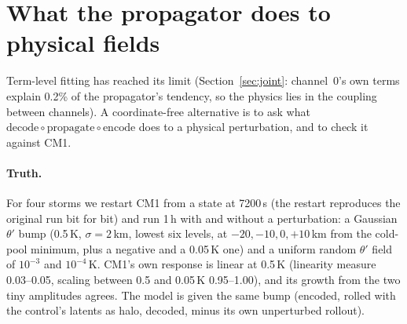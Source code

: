 \documentclass[11pt]{article}
\begin{document}
\section{What the propagator does to physical fields}\label{sec:paired}
Term-level fitting has reached its limit (Section~\ref{sec:joint}: channel~0's own terms explain 0.2\% of the propagator's tendency, so the physics lies in the coupling between channels). A coordinate-free alternative is to ask what $\mathrm{decode}\circ\mathrm{propagate}\circ\mathrm{encode}$ does to a physical perturbation, and to check it against CM1.

\paragraph{Truth.} For four storms we restart CM1 from a state at 7200\,s (the restart reproduces the original run bit for bit) and run 1\,h with and without a perturbation: a Gaussian $\theta'$ bump (0.5\,K, $\sigma = 2$\,km, lowest six levels, at $-20, -10, 0, +10$\,km from the cold-pool minimum, plus a negative and a 0.05\,K one) and a uniform random $\theta'$ field of $10^{-3}$ and $10^{-4}$\,K. CM1's own response is linear at 0.5\,K (linearity measure 0.03--0.05, scaling between 0.5 and 0.05\,K 0.95--1.00), and its growth from the two tiny amplitudes agrees. The model is given the same bump (encoded, rolled with the control's latents as halo, decoded, minus its own unperturbed rollout).
\end{document}
